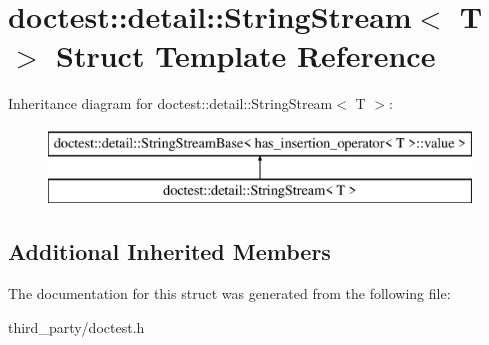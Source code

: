 \hypertarget{structdoctest_1_1detail_1_1_string_stream}{}\section{doctest\+::detail\+::String\+Stream$<$ T $>$ Struct Template Reference}
\label{structdoctest_1_1detail_1_1_string_stream}
Inheritance diagram for doctest\+::detail\+::String\+Stream$<$ T $>$\+:\begin{figure}[H]
\begin{center}
\leavevmode
\includegraphics[height=2.000000cm]{structdoctest_1_1detail_1_1_string_stream}
\end{center}
\end{figure}
\subsection*{Additional Inherited Members}


The documentation for this struct was generated from the following file\+:\begin{DoxyCompactItemize}
\item 
third\+\_\+party/doctest.\+h\end{DoxyCompactItemize}
